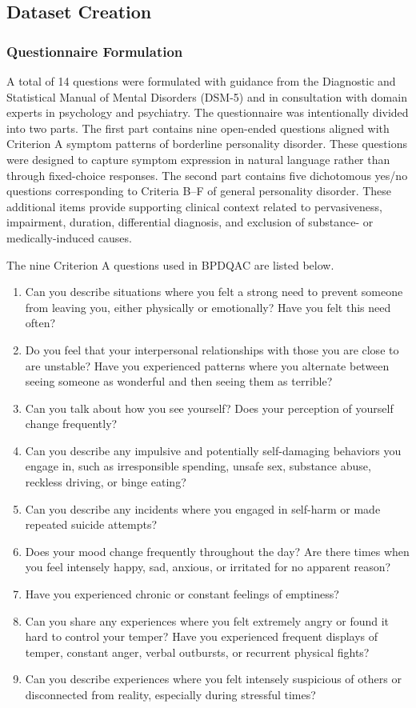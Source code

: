 \documentclass{article}
\begin{document}
\subsection{Dataset Creation}

\subsubsection{Questionnaire Formulation}
A total of 14 questions were formulated with guidance from the Diagnostic and Statistical Manual of Mental Disorders (DSM-5) \cite{dsm} and in consultation with domain experts in psychology and psychiatry. The questionnaire was intentionally divided into two parts. The first part contains nine open-ended questions aligned with Criterion A symptom patterns of borderline personality disorder. These questions were designed to capture symptom expression in natural language rather than through fixed-choice responses. The second part contains five dichotomous yes/no questions corresponding to Criteria B--F of general personality disorder. These additional items provide supporting clinical context related to pervasiveness, impairment, duration, differential diagnosis, and exclusion of substance- or medically-induced causes.

The nine Criterion A questions used in BPDQAC are listed below.
\begin{enumerate}
    \item Can you describe situations where you felt a strong need to prevent someone from leaving you, either physically or emotionally? Have you felt this need often?
    \item Do you feel that your interpersonal relationships with those you are close to are unstable? Have you experienced patterns where you alternate between seeing someone as wonderful and then seeing them as terrible?
    \item Can you talk about how you see yourself? Does your perception of yourself change frequently?
    \item Can you describe any impulsive and potentially self-damaging behaviors you engage in, such as irresponsible spending, unsafe sex, substance abuse, reckless driving, or binge eating?
    \item Can you describe any incidents where you engaged in self-harm or made repeated suicide attempts?
    \item Does your mood change frequently throughout the day? Are there times when you feel intensely happy, sad, anxious, or irritated for no apparent reason?
    \item Have you experienced chronic or constant feelings of emptiness?
    \item Can you share any experiences where you felt extremely angry or found it hard to control your temper? Have you experienced frequent displays of temper, constant anger, verbal outbursts, or recurrent physical fights?
    \item Can you describe experiences where you felt intensely suspicious of others or disconnected from reality, especially during stressful times?
\end{enumerate}
\end{document}
